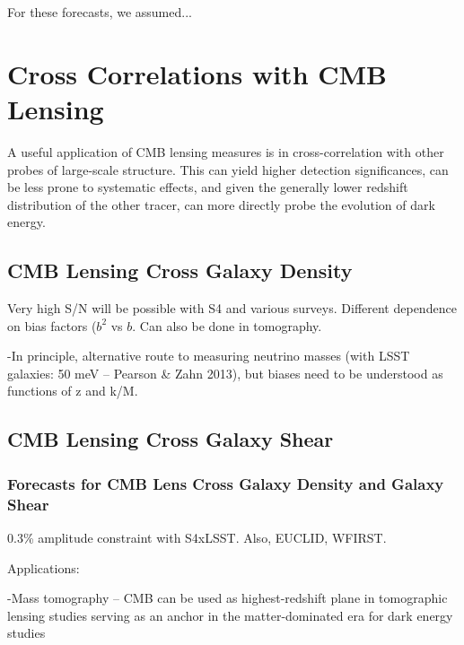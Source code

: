 
For these forecasts, we assumed...

\section{Cross Correlations with CMB Lensing}\label{cross}

A useful application of CMB lensing measures is in cross-correlation with other probes of large-scale structure.  This can yield higher detection significances, can be less prone to systematic effects, and given the generally lower redshift distribution of the other tracer, can more directly probe the evolution of dark energy.


\subsection{CMB Lensing Cross Galaxy Density}


Very high S/N will be possible with S4 and various surveys.   Different dependence on bias factors ($b^2$ vs $b$.  Can also be done in tomography.

-In principle, alternative route to measuring neutrino masses (with LSST galaxies: 50 meV -- Pearson \& Zahn 2013), but biases need to be understood as functions of z and k/M.  

\subsection{CMB Lensing Cross Galaxy Shear}



\subsubsection{Forecasts for CMB Lens Cross Galaxy Density and Galaxy Shear}\label{crossForecast}

0.3\% amplitude constraint with S4xLSST.  Also, EUCLID, WFIRST.

Applications:

-Mass tomography -- CMB can be used as highest-redshift plane in tomographic lensing studies serving as an anchor in the matter-dominated era for dark energy studies

